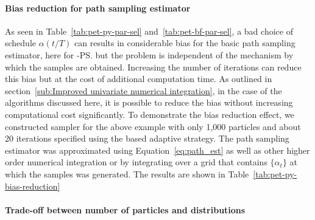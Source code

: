 \paragraph{Bias reduction for path sampling estimator}



As seen in Table~\ref{tab:pet-py-par-sel} and~\ref{tab:pet-bf-par-sel}, a bad
choice of schedule $\alpha(t/T)$ can results in considerable bias for the
basic path sampling estimator, here for \smc[2]-\ps but the problem is
independent of the mechanism by which the samples are obtained. Increasing the
number of iterations can reduce this bias but at the cost of additional
computation time. As outlined in section~\ref{sub:Improved univariate
  numerical integration}, in the case of the \smc algorithms discussed here,
it is possible to reduce the bias without increasing computational cost
significantly. To demonstrate the bias reduction effect, we constructed \smc
sampler for the above \pet example with only 1,000 particles and about 20
iterations specified using the \cess based adaptive strategy. The path
sampling estimator was approximated using Equation~\eqref{eq:path_est} as well
as other higher order numerical integration or by integrating over a grid that
contains $\{\alpha_t\}$ at which the samples was generated. The results are
shown in Table~\ref{tab:pet-py-bias-reduction}

\paragraph{Trade-off between number of particles and distributions}



